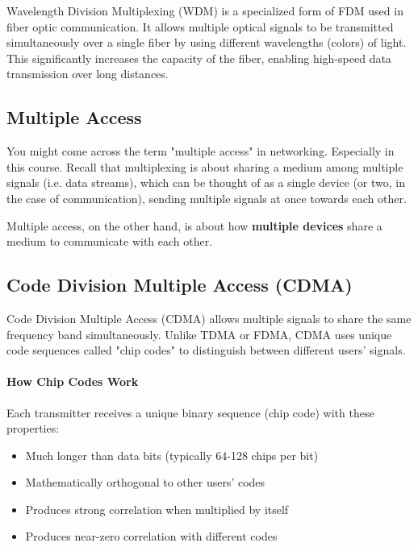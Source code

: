 Wavelength Division Multiplexing (WDM) is a specialized form of FDM used in fiber optic communication. It allows multiple optical signals to be transmitted simultaneously over a single fiber by using different wavelengths (colors) of light. This significantly increases the capacity of the fiber, enabling high-speed data transmission over long distances.


\subsection{Multiple Access}
You might come across the term "multiple access" in networking. Especially in this course. Recall that multiplexing is about sharing a medium among multiple signals (i.e. data streams), which can be thought of as a single device (or two, in the case of communication), sending multiple signals at once towards each other.

\begin{importantblock}
    Multiple access, on the other hand, is about how \textbf{multiple devices} share a medium to communicate with each other.
\end{importantblock}

\subsection{Code Division Multiple Access (CDMA)}
\label{subsec:cdma}
Code Division Multiple Access (CDMA) allows multiple signals to share the same frequency band simultaneously. Unlike TDMA or FDMA, CDMA uses unique code sequences called "chip codes" to distinguish between different users' signals.

\paragraph{How Chip Codes Work}


Each transmitter receives a unique binary sequence (chip code) with these properties:
\begin{itemize}
    \item Much longer than data bits (typically 64-128 chips per bit)
    \item Mathematically orthogonal to other users' codes
    \item Produces strong correlation when multiplied by itself
    \item Produces near-zero correlation with different codes
\end{itemize}

